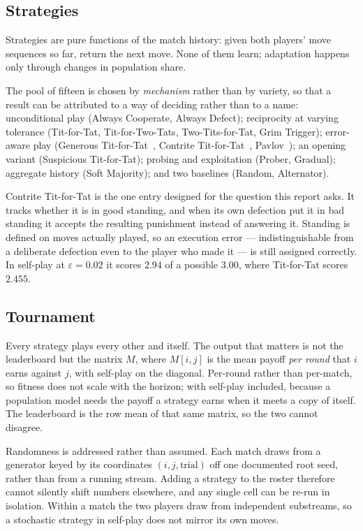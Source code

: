 \documentclass[11pt,a4paper]{article}
\newcommand{\eps}{\varepsilon}
\begin{document}
\subsection{Strategies}
\label{sec:strategies}

Strategies are pure functions of the match history: given both players' move
sequences so far, return the next move. None of them learn; adaptation happens
only through changes in population share.

The pool of fifteen is chosen by \emph{mechanism} rather than by variety, so
that a result can be attributed to a way of deciding rather than to a name:
unconditional play (Always Cooperate, Always Defect); reciprocity at varying
tolerance (Tit-for-Tat, Tit-for-Two-Tats, Two-Tits-for-Tat, Grim Trigger);
error-aware play (Generous Tit-for-Tat~\cite{molander1985},
Contrite Tit-for-Tat~\cite{boyd1989}, Pavlov~\cite{nowak1993}); an opening
variant (Suspicious Tit-for-Tat); probing and exploitation (Prober, Gradual);
aggregate history (Soft Majority); and two baselines (Random, Alternator).

Contrite Tit-for-Tat is the one entry designed for the question this report
asks. It tracks whether it is in good standing, and when its own defection put
it in bad standing it accepts the resulting punishment instead of answering it.
Standing is defined on moves actually played, so an execution error ---
indistinguishable from a deliberate defection even to the player who made it ---
is still assigned correctly. In self-play at $\eps = 0.02$ it scores $2.94$ of a
possible $3.00$, where Tit-for-Tat scores $2.455$.

\subsection{Tournament}
\label{sec:tournament}

Every strategy plays every other and itself. The output that matters is not the
leaderboard but the matrix $M$, where $M[i,j]$ is the mean payoff \emph{per
round} that $i$ earns against $j$, with self-play on the diagonal. Per-round
rather than per-match, so fitness does not scale with the horizon; with
self-play included, because a population model needs the payoff a strategy earns
when it meets a copy of itself. The leaderboard is the row mean of that same
matrix, so the two cannot disagree.

Randomness is addressed rather than assumed. Each match draws from a generator
keyed by its coordinates $(i,j,\text{trial})$ off one documented root seed,
rather than from a running stream. Adding a strategy to the roster therefore
cannot silently shift numbers elsewhere, and any single cell can be re-run in
isolation. Within a match the two players draw from independent substreams, so a
stochastic strategy in self-play does not mirror its own moves.
\end{document}
